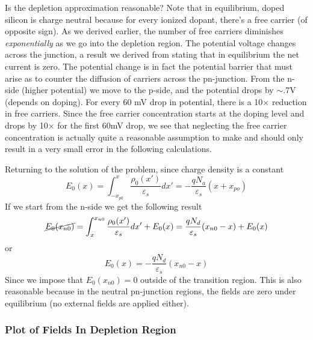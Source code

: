 Is the depletion approximation reasonable?  Note that in equilibrium, doped silicon is charge neutral because for every ionized dopant, there's a free carrier (of opposite sign).   As we derived earlier, the number of free carriers diminishes \textit{exponentially} as we go into the depletion region.  The potential voltage changes across the junction, a result we derived from stating that in equilibrium the net  current is zero.  The potential change is in fact the potential barrier that must arise as to counter the diffusion of carriers across the pn-junction.   From the n-side (higher potential) we move to the p-side, and the potential drops by $\sim$.7V (depends on doping).  For every 60 mV drop in potential, there is a 10$\times$ reduction in free carriers.  Since the free carrier concentration starts at the doping level and drops by 10$\times$ for the first 60mV drop, we see that neglecting the free carrier concentration is actually quite a reasonable assumption to make and should only result in a very small error in the following calculations.
 
Returning to the solution of the problem, since charge density is a constant
%
\begin{equation} 
	{E_0}(x) = \int_{ - {x_{p0}}}^x {\frac{{{\rho _0}(x')}}{{{\varepsilon _s}}}dx'}  =  - \frac{{q{N_a}}}{{{\varepsilon _s}}}(x + {x_{po}}) 
\end{equation}
%
If we start from the n-side we get the following result
%
\begin{equation} 
\cancel{{E_0}({x_{n0}})} = \int_x^{{x_{n0}}} {\frac{{{\rho _0}(x')}}{{{\varepsilon _s}}}dx'}  + {E_0}(x) = \frac{{q{N_d}}}{{{\varepsilon _s}}}({x_{n0}} - x) + {E_0}(x) 
\end{equation}
%
or
%
\begin{equation} 
	E_0(x) =  - \frac{{q{N_d}}}{{{\varepsilon _s}}}({x_{n0}} - x)
\end{equation}
Since we impose that $E_0(x_{n0}) = 0$ outside of the transition region.  This is also reasonable because in the neutral pn-junction regions, the fields are zero under equilibrium (no external fields are applied either).  
 


\subsubsection{Plot of Fields In Depletion Region}

